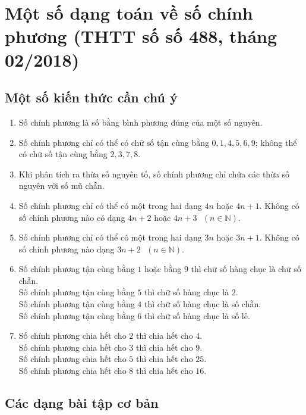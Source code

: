 \section{Một số dạng toán về số chính phương (THTT số số 488, tháng 02/2018)}
\begin{center}
	\textbf{\color{violet}{Hà Văn Nhân\\
			(GV THCS Hoằng Xuân, Hoằng Hóa, Thanh Hóa)}}
\end{center}
\subsection{Một số kiến thức cần chú ý}
\begin{enumerate}[1.]
	\item Số chính phương là số bằng bình phương đúng của một số nguyên.
	\item Số chính phương chỉ có thể có chữ số tận cùng bằng $0,1,4,5,6,9$; không thể có chữ số tận cùng bằng $2,3,7,8$.
	\item Khi phân tích ra thừa số nguyên tố, số chính phương chỉ chứa các thừa số nguyên với số mũ chẵn.
	\item Số  chính phương chỉ có thể có một trong hai dạng $4n$ hoặc $4n+1$. Không có số chính phương nào có dạng $4n+2$ hoặc $4n+3 \text{ } (n\in \mathbb{N})$.
	\item Số chính phương chỉ có thể có một trong hai dạng $3n$ hoặc $3n+1$. Không có số chính phương nào dạng $3n+2 \text{ } (n\in \mathbb{N})$.
	\item Số chính phương tận cùng bằng $1$ hoặc bằng $9$ thì chữ số hàng chục là chữ số chẵn.\\
	Số chính phương tận cùng bằng $5$ thì chữ số hàng chục là $2$.\\
	Số chính phương tận cùng bằng $4$ thì chữ số hàng chục là số chẵn.\\
	Số chính phương tận cùng bằng $6$ thì chữ số hàng chục là số lẻ.
	\item Số chính phương chia hết cho $2$ thì chia hết cho $4$.\\
	Số chính phương chia hết cho $3$ thì chia hết cho $9$.\\
	Số chính phương chia hết cho $5$ thì chia hết cho $25$.\\
	Số chính phương chia hết cho $8$ thì chia hết cho $16$.
\end{enumerate}
\subsection{Các dạng bài tập cơ bản}
